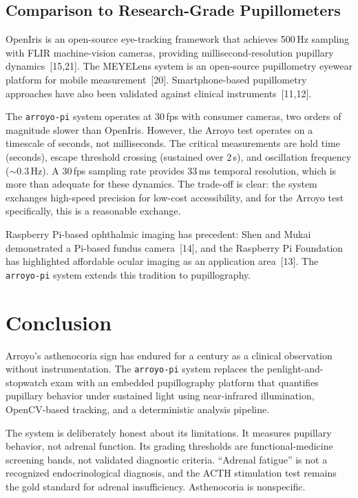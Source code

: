 \documentclass[11pt]{article}
\begin{document}
\subsection{Comparison to Research-Grade Pupillometers}

OpenIris is an open-source eye-tracking framework that achieves 500\,Hz
sampling with FLIR machine-vision cameras, providing millisecond-resolution
pupillary dynamics~[15,21]. The MEYELens system is an open-source
pupil\-lom\-etry eyewear platform for mobile measurement~[20].
Smart\-phone-based pupillometry approaches have also been validated
against clinical instruments~[11,12].

The \texttt{arroyo-pi} system operates at 30\,fps with consumer cameras, two
orders of magnitude slower than OpenIris. However, the Arroyo test operates
on a timescale of seconds, not milliseconds. The critical measurements are
hold time (seconds), escape threshold crossing (sustained over 2\,s), and
oscillation frequency ($\sim$0.3\,Hz). A 30\,fps sampling rate provides
33\,ms temporal resolution, which is more than adequate for these dynamics.
The trade-off is clear: the system exchanges high-speed precision for
low-cost accessibility, and for the Arroyo test specifically, this is a
reasonable exchange.

Raspberry Pi-based ophthalmic imaging has precedent: Shen and Mukai
demonstrated a Pi-based fundus camera~[14], and the Raspberry Pi Foundation
has highlighted affordable ocular imaging as an application
area~[13]. The \texttt{arroyo-pi} system extends this tradition to
pupillography.

\section{Conclusion}

Arroyo's asthenocoria sign has endured for a century as a clinical
observation without instrumentation. The \texttt{arroyo-pi} system replaces
the penlight-and-stopwatch exam with an embedded pupillography platform that
quantifies pupillary behavior under sustained light using near-infrared
illumination, OpenCV-based tracking, and a deterministic analysis pipeline.

The system is deliberately honest about its limitations. It measures pupillary
behavior, not adrenal function. Its grading thresholds are functional-medicine
screening bands, not validated diagnostic criteria. ``Adrenal fatigue'' is not
a recognized endocrinological diagnosis, and the ACTH stimulation test remains
the gold standard for adrenal insufficiency. Asthenocoria is nonspecific.
\end{document}
